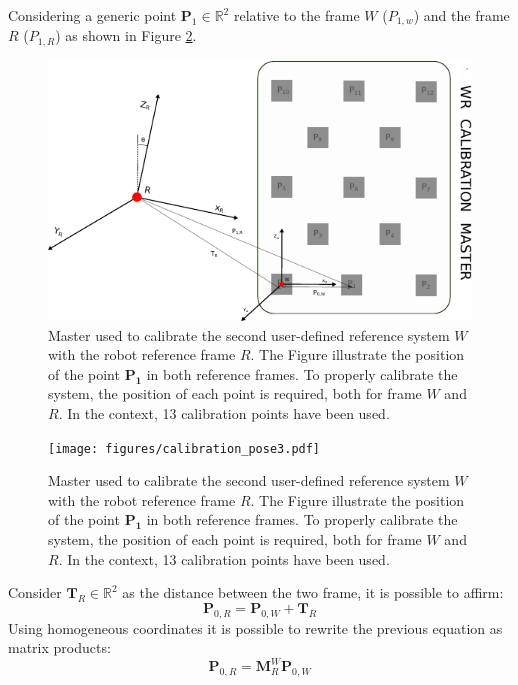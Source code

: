 \documentclass[letterpaper, 10 pt, conference]{ieeeconf}  %
\begin{document}
Considering a generic point $\mathbf{P}_1\in\mathbb{R}^2$ relative to the frame $W$ ($P_{1,w}$) and the frame $R$ ($P_{1,R}$) as shown in Figure \ref{fig:master_robot}.
\begin{figure}[]
	\centering
	\includegraphics[width=1\columnwidth]{figures/calibration_master2.pdf}
	\caption{Master used to calibrate the second user-defined reference system $W$ with the robot reference frame $R$. The Figure illustrate the position of the point $\mathbf{P_1}$ in both reference frames. To properly calibrate the system, the position of each point is required, both for frame $W$ and $R$. In the context, 13 calibration points have been used.}
	\label{fig:master_robot}
\end{figure}
\begin{figure}[]
	\centering
	\texttt{[image: figures/calibration\_pose3.pdf]}
	\caption{Master used to calibrate the second user-defined reference system $W$ with the robot reference frame $R$. The Figure illustrate the position of the point $\mathbf{P_1}$ in both reference frames. To properly calibrate the system, the position of each point is required, both for frame $W$ and $R$. In the context, 13 calibration points have been used.}
	\label{fig:master_robot}
\end{figure}
Consider $\mathbf{T}_R\in\mathbb{R}^2$ as the distance between the two frame, it is possible to affirm:
\begin{equation}
\mathbf{P}_{0,R} = \mathbf{P}_{0,W} + \mathbf{T}_R
\end{equation}
Using homogeneous coordinates it is possible to rewrite the previous equation as matrix products:
\begin{equation}\label{eq:matrix_M}
\mathbf{P}_{0,R} = \mathbf{M}^W_{R}\mathbf{P}_{0,W}
\end{equation}
\end{document}
